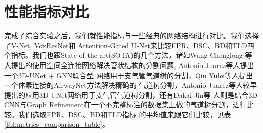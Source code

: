 \section{性能指标对比}

完成了综合实验之后，我们就性能指标与一些经典的网络结构进行对比。我们选择了V-Net\cite{Milletar2016VNetFC}, VoxResNet\cite{CHEN2018446}和
Attention-Gated U-Net\cite{Oktay2018AttentionUL}来比较FPR、DSC、BD和TLD四个指标。我们也跟State-of-the-art(SOTA)的几个方法，诸如Wang Chenglong
等人\cite{Wang2019TubularSegment}提出的使用空间全连接网络解决管状结构的分割问题, Antonio Juarez等人提出一个3D-UNet + GNN联合型
网络\cite{Juarez2019Joint3DUNetGraph}用于支气管气道树的分割，Qin Yulei等人\cite{Qin2019AirwayNet}提出一个体素连接的AirwayNet方法解决精确的
气道树分割，Antonio Juarez等人\cite{Juarez2018AutoAirwaySegment}较早提出的应用3D-UNet网络用于支气管气道树分割，还有Dakai Jin等
人\cite{Dakai2017GraphRefinement}则是结合3D CNN与Graph Refinement在一个不完整标注的数据集上做的气道树分割，进行比较。我们选取FPR、DSC、BD和TLD指标
的平均值来跟它们比较，见表\ref{tbl:metrics_comparison_table}。
